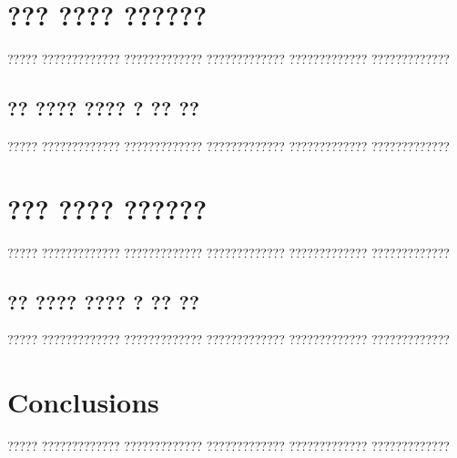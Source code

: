 \documentclass[11pt,catalan,listoffigures,listoftables]{tfgetsinf}
\begin{document}



\chapter{??? ???? ??????}

????? ????????????? ????????????? ????????????? ????????????? ?????????????

\section{?? ???? ???? ? ?? ??}

????? ????????????? ????????????? ????????????? ????????????? ?????????????

\chapter{??? ???? ??????}

????? ????????????? ????????????? ????????????? ????????????? ????????????? 

\section{?? ???? ???? ? ?? ??}

????? ????????????? ????????????? ????????????? ????????????? ?????????????


\chapter{Conclusions}

????? ????????????? ????????????? ????????????? ????????????? ????????????? 
\end{document}
